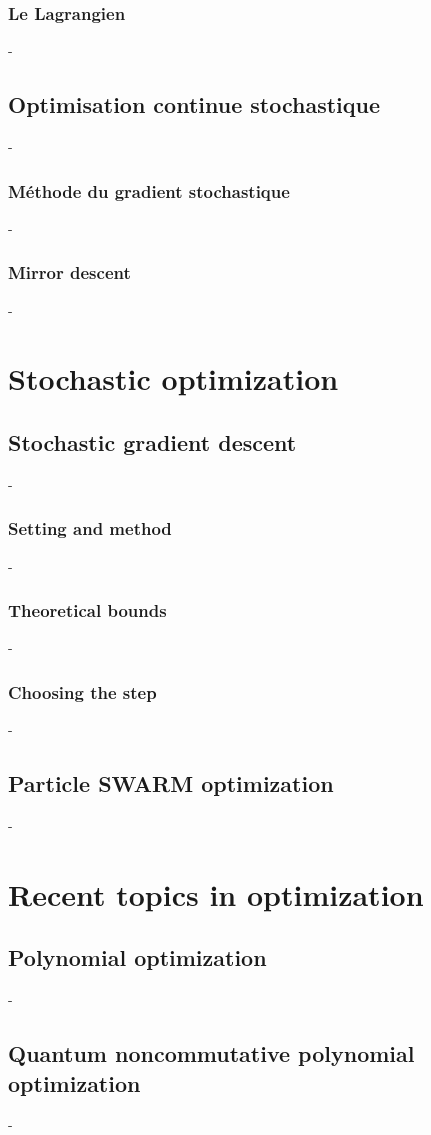 \documentclass[12pt,openany,oneside]{book}
\theoremstyle{definition}
\numberwithin{definition}{section}
\numberwithin{theorem}{section}
\numberwithin{corollary}{section}
\numberwithin{proposition}{section}
\numberwithin{notation}{section}
\numberwithin{remark}{section}
\numberwithin{hypothesis}{section}
\numberwithin{example}{section}
\begin{document}
\subsection{Le Lagrangien}-
\section{Optimisation continue stochastique}-
\subsection{Méthode du gradient stochastique}-
\subsection{Mirror descent}-

\chapter{Stochastic optimization}

\section{Stochastic gradient descent}-
\subsection{Setting and method}-
\subsection{Theoretical bounds}-
\subsection{Choosing the step}-
\section{Particle SWARM optimization}-

\chapter{Recent topics in optimization}

\section{Polynomial optimization}-
\section{Quantum noncommutative polynomial optimization}-
\end{document}
